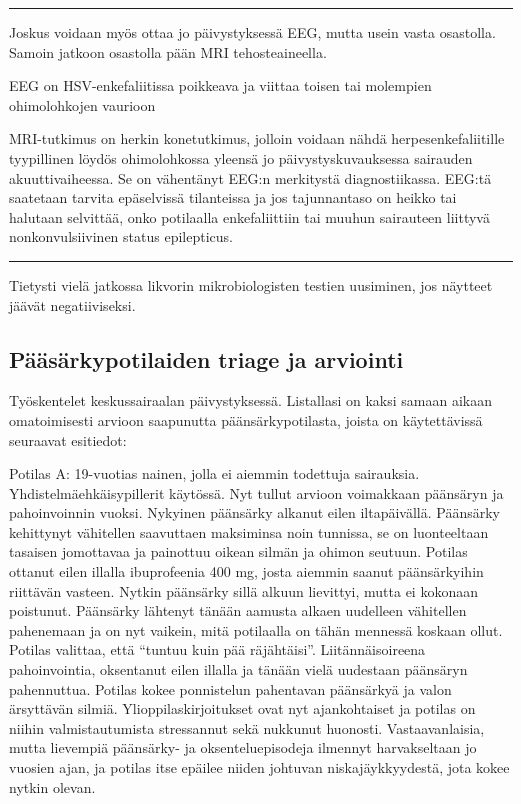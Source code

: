 \documentclass[
]{book}
\begin{document}
\begin{center}\rule{0.5\linewidth}{0.5pt}\end{center}

Joskus voidaan myös ottaa jo päivystyksessä EEG, mutta usein vasta osastolla. Samoin jatkoon osastolla pään MRI tehosteaineella.

EEG on HSV-enkefaliitissa poikkeava ja viittaa toisen tai molempien ohimolohkojen vaurioon

MRI-tutkimus on herkin konetutkimus, jolloin voidaan nähdä herpesenkefaliitille tyypillinen löydös ohimolohkossa yleensä jo päivystyskuvauksessa sairauden akuuttivaiheessa. Se on vähentänyt EEG:n merkitystä diagnostiikassa. EEG:tä saatetaan tarvita epäselvissä tilanteissa ja jos tajunnantaso on heikko tai halutaan selvittää, onko potilaalla enkefaliittiin tai muuhun sairauteen liittyvä nonkonvulsiivinen status epilepticus.

\begin{center}\rule{0.5\linewidth}{0.5pt}\end{center}

Tietysti vielä jatkossa likvorin mikrobiologisten testien uusiminen, jos näytteet jäävät negatiiviseksi.

\subsection{Pääsärkypotilaiden triage ja arviointi}\label{puxe4uxe4suxe4rkypotilaiden-triage-ja-arviointi}

Työskentelet keskussairaalan päivystyksessä. Listallasi on kaksi samaan aikaan omatoimisesti arvioon saapunutta päänsärkypotilasta, joista on käytettävissä seuraavat esitiedot:

Potilas A: 19-vuotias nainen, jolla ei aiemmin todettuja sairauksia. Yhdistelmäehkäisypillerit käytössä. Nyt tullut arvioon voimakkaan päänsäryn ja pahoinvoinnin vuoksi. Nykyinen päänsärky alkanut eilen iltapäivällä. Päänsärky kehittynyt vähitellen saavuttaen maksiminsa noin tunnissa, se on luonteeltaan tasaisen jomottavaa ja painottuu oikean silmän ja ohimon seutuun. Potilas ottanut eilen illalla ibuprofeenia 400 mg, josta aiemmin saanut päänsärkyihin riittävän vasteen. Nytkin päänsärky sillä alkuun lievittyi, mutta ei kokonaan poistunut. Päänsärky lähtenyt tänään aamusta alkaen uudelleen vähitellen pahenemaan ja on nyt vaikein, mitä potilaalla on tähän mennessä koskaan ollut. Potilas valittaa, että ``tuntuu kuin pää räjähtäisi''. Liitännäisoireena pahoinvointia, oksentanut eilen illalla ja tänään vielä uudestaan päänsäryn pahennuttua. Potilas kokee ponnistelun pahentavan päänsärkyä ja valon ärsyttävän silmiä. Ylioppilaskirjoitukset ovat nyt ajankohtaiset ja potilas on niihin valmistautumista stressannut sekä nukkunut huonosti. Vastaavanlaisia, mutta lievempiä päänsärky- ja oksenteluepisodeja ilmennyt harvakseltaan jo vuosien ajan, ja potilas itse epäilee niiden johtuvan niskajäykkyydestä, jota kokee nytkin olevan.
\end{document}
